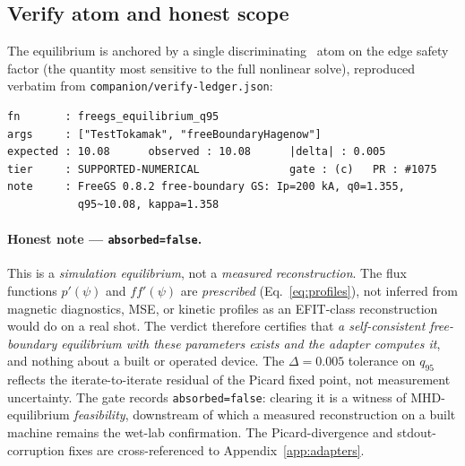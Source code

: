 \subsection{Verify atom and honest scope}
\label{app:gs-verify}

The equilibrium is anchored by a single discriminating \tierGreen\ atom on
the edge safety factor (the quantity most sensitive to the full nonlinear
solve), reproduced verbatim from \texttt{companion/verify-ledger.json}:

\begin{lstlisting}
fn       : freegs_equilibrium_q95
args     : ["TestTokamak", "freeBoundaryHagenow"]
expected : 10.08      observed : 10.08      |delta| : 0.005
tier     : SUPPORTED-NUMERICAL              gate : (c)   PR : #1075
note     : FreeGS 0.8.2 free-boundary GS: Ip=200 kA, q0=1.355,
           q95~10.08, kappa=1.358
\end{lstlisting}

\paragraph{Honest note --- \texttt{absorbed=false}.}
This is a \emph{simulation equilibrium}, not a \emph{measured
reconstruction}. The flux functions $p'(\psi)$ and $ff'(\psi)$ are
\emph{prescribed} (Eq.~\ref{eq:profiles}), not inferred from magnetic
diagnostics, MSE, or kinetic profiles as an EFIT-class reconstruction would
do on a real shot. The verdict therefore certifies that \emph{a
self-consistent free-boundary equilibrium with these parameters exists and
the adapter computes it}, and nothing about a built or operated device. The
$\Delta=0.005$ tolerance on $q_{95}$ reflects the iterate-to-iterate
residual of the Picard fixed point, not measurement uncertainty. The gate
records \texttt{absorbed=false}: clearing it is a witness of MHD-equilibrium
\emph{feasibility}, downstream of which a measured reconstruction on a built
machine remains the wet-lab confirmation. The Picard-divergence and
stdout-corruption fixes are cross-referenced to
Appendix~\ref{app:adapters}.
